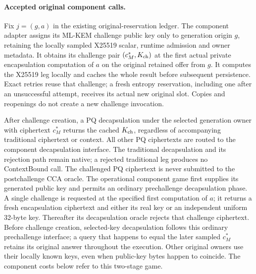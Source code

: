 \paragraph{Accepted original component calls.}
Fix $j=(g,a)$ in the existing original-reservation ledger. The component
adapter assigns its ML-KEM challenge public key only to generation origin
$g$, retaining the locally sampled X25519 scalar, runtime admission and
owner metadata. It obtains its challenge pair $(c_M^*,K_{\rm ch})$ at the
first actual private encapsulation computation of $a$ on the original
retained offer from $g$. It computes the X25519 leg locally and caches the
whole result before subsequent persistence. Exact retries reuse that
challenge; a fresh entropy reservation, including one after an unsuccessful
attempt, receives its actual new original slot. Copies and reopenings do
not create a new challenge invocation.

After challenge creation, a PQ decapsulation under the selected generation
owner with ciphertext $c_M^*$ returns the cached $K_{\rm ch}$, regardless
of accompanying traditional ciphertext or context. All other PQ
ciphertexts are routed to the component decapsulation interface. The
traditional decapsulation and its rejection path remain native; a rejected
traditional leg produces no ContextBound call. The challenged PQ
ciphertext is never submitted to the postchallenge CCA oracle. The operational component game first supplies its generated public key
and permits an ordinary prechallenge decapsulation phase. A single
challenge is requested at the specified first computation of $a$; it
returns a fresh encapsulation ciphertext and either its real key or an
independent uniform 32-byte key. Thereafter its decapsulation oracle
rejects that challenge ciphertext. Before challenge creation, selected-key
decapsulation follows this ordinary prechallenge interface; a query that
happens to equal the later sampled $c_M^*$ retains its original answer
throughout the execution. Other original owners use their locally known
keys, even when public-key bytes happen to coincide. The component costs
below refer to this two-stage game.

